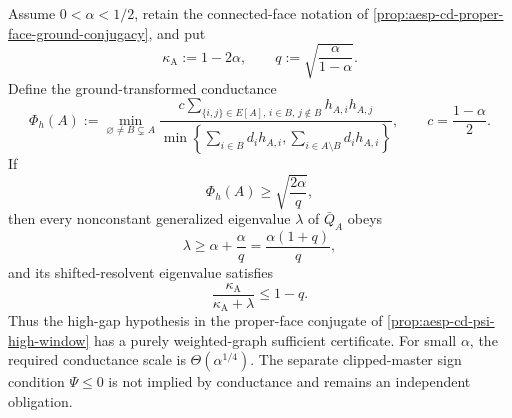 \begin{corollary}
\label{cor:aesp-cd-proper-face-conductance-gap}
Assume \(0<\alpha<1/2\), retain the connected-face notation of
\cref{prop:aesp-cd-proper-face-ground-conjugacy}, and put
\begin{equation*}
 \kappa_{\mathrm A}:=1-2\alpha,
 \qquad
 q:=\sqrt{\frac{\alpha}{1-\alpha}}.
\end{equation*}
Define the ground-transformed conductance
\begin{equation}
 \Phi_h(A)
 :=\min_{\varnothing\neq B\subsetneq A}
 \frac{
   c\sum_{\{i,j\}\in E[A],\,i\in B,\,j\notin B}h_{A,i}h_{A,j}
 }{
   \min\left\{
    \sum_{i\in B}d_ih_{A,i},
    \sum_{i\in A\setminus B}d_ih_{A,i}
   \right\}
 },
 \qquad c=\frac{1-\alpha}{2}.
 \label{eq:aesp-cd-proper-face-ground-conductance}
\end{equation}
If
\begin{equation}
 \Phi_h(A)\geq\sqrt{\frac{2\alpha}{q}},
 \label{eq:aesp-cd-proper-face-conductance-threshold}
\end{equation}
then every nonconstant generalized eigenvalue \(\lambda\) of
\(\bar Q_A\) obeys
\begin{equation*}
 \lambda\geq\alpha+\frac{\alpha}{q}
 =\frac{\alpha(1+q)}q,
\end{equation*}
and its shifted-resolvent eigenvalue satisfies
\begin{equation*}
 \frac{\kappa_{\mathrm A}}{\kappa_{\mathrm A}+\lambda}
 \leq1-q.
\end{equation*}
Thus the high-gap hypothesis in the proper-face conjugate of
\cref{prop:aesp-cd-psi-high-window} has a purely weighted-graph sufficient
certificate.  For small \(\alpha\), the required conductance scale is
\(\Theta(\alpha^{1/4})\).  The separate clipped-master sign condition
\(\Psi\leq0\) is not implied by conductance and remains an independent
obligation.
\end{corollary}

